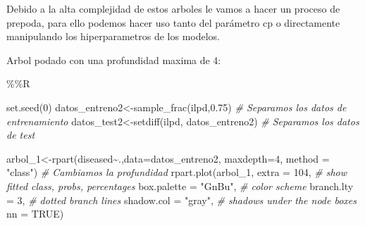 \documentclass[
  11pt,
  a4paper,
]{article}
\newenvironment{Shaded}{\begin{snugshade}}{\end{snugshade}}
\newcommand{\AttributeTok}[1]{\textcolor[rgb]{0.77,0.63,0.00}{#1}}
\newcommand{\CommentTok}[1]{\textcolor[rgb]{0.56,0.35,0.01}{\textit{#1}}}
\newcommand{\ConstantTok}[1]{\textcolor[rgb]{0.00,0.00,0.00}{#1}}
\newcommand{\DecValTok}[1]{\textcolor[rgb]{0.00,0.00,0.81}{#1}}
\newcommand{\FloatTok}[1]{\textcolor[rgb]{0.00,0.00,0.81}{#1}}
\newcommand{\FunctionTok}[1]{\textcolor[rgb]{0.00,0.00,0.00}{#1}}
\newcommand{\NormalTok}[1]{#1}
\newcommand{\OtherTok}[1]{\textcolor[rgb]{0.56,0.35,0.01}{#1}}
\newcommand{\SpecialCharTok}[1]{\textcolor[rgb]{0.00,0.00,0.00}{#1}}
\newcommand{\StringTok}[1]{\textcolor[rgb]{0.31,0.60,0.02}{#1}}
\begin{document}
\vspace{0.25cm}

Debido a la alta complejidad de estos arboles le vamos a hacer un
proceso de prepoda, para ello podemos hacer uso tanto del parámetro cp o
directamente manipulando los hiperparametros de los modelos.

\vspace{0.25cm}

Arbol podado con una profundidad maxima de 4:

\begin{Shaded}
\begin{Highlighting}[]
\SpecialCharTok{\%\%}\NormalTok{R}

\FunctionTok{set.seed}\NormalTok{(}\DecValTok{0}\NormalTok{)}
\NormalTok{datos\_entreno2}\OtherTok{\textless{}{-}}\FunctionTok{sample\_frac}\NormalTok{(ilpd,}\FloatTok{0.75}\NormalTok{)  }\CommentTok{\# Separamos los datos de entrenamiento}
\NormalTok{datos\_test2}\OtherTok{\textless{}{-}}\FunctionTok{setdiff}\NormalTok{(ilpd, datos\_entreno2) }\CommentTok{\# Separamos los datos de test}

\NormalTok{arbol\_1}\OtherTok{\textless{}{-}}\FunctionTok{rpart}\NormalTok{(diseased}\SpecialCharTok{\textasciitilde{}}\NormalTok{.,}\AttributeTok{data=}\NormalTok{datos\_entreno2, }\AttributeTok{maxdepth=}\DecValTok{4}\NormalTok{, }\AttributeTok{method =} \StringTok{"class"}\NormalTok{) }\CommentTok{\# Cambiamos la profundidad}
\FunctionTok{rpart.plot}\NormalTok{(arbol\_1, }
           \AttributeTok{extra =} \DecValTok{104}\NormalTok{,          }\CommentTok{\# show fitted class, probs, percentages}
           \AttributeTok{box.palette =} \StringTok{"GnBu"}\NormalTok{, }\CommentTok{\# color scheme}
           \AttributeTok{branch.lty =} \DecValTok{3}\NormalTok{,       }\CommentTok{\# dotted branch lines}
           \AttributeTok{shadow.col =} \StringTok{"gray"}\NormalTok{,  }\CommentTok{\# shadows under the node boxes}
           \AttributeTok{nn =} \ConstantTok{TRUE}\NormalTok{)}
\end{Highlighting}
\end{Shaded}
\end{document}
